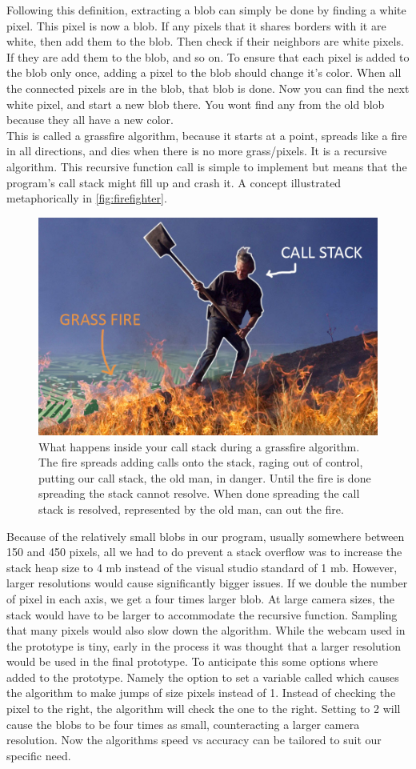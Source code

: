 Following this definition, extracting a blob can simply be done by finding a white pixel. This pixel is now a blob. If any pixels that it shares borders with it are white, then add them to the blob. Then check if their neighbors are white pixels. If they are add them to the blob, and so on. To ensure that each pixel is added to the blob only once, adding a pixel to the blob should change it's color. When all the connected pixels are in the blob, that blob is done. Now you can find the next white pixel, and start a new blob there. You wont find any from the old blob because they all have a new color.\\
This is called a grassfire algorithm, because it starts at a point, spreads like a fire in all directions, and dies when there is no more grass/pixels.
It is a recursive algorithm. This recursive function call is simple to implement but means that the program's call stack might fill up and crash it. A concept illustrated metaphorically in \autoref{fig:firefighter}.  
\begin{figure}[H]
	\centering
	\includegraphics[width=0.6\linewidth]{figure/Analysis/firefighter.jpg}
	\caption{What happens inside your call stack during a grassfire algorithm. The fire spreads adding calls onto the stack, raging out of control, putting our call stack, the old man, in danger. Until the fire is done spreading the stack cannot resolve. When done spreading the call stack is resolved, represented by the old man, can out the fire.}
	\label{fig:firefighter}
\end{figure} 
Because of the relatively small blobs in our program, usually somewhere between 150 and 450 pixels, all we had to do prevent a stack overflow was to increase the stack heap size to 4 mb instead of the visual studio standard of 1 mb. However, larger resolutions would cause significantly bigger issues. If we double the number of pixel in each axis, we get a four times larger blob. At large camera sizes, the stack would have to be larger to accommodate the recursive function. Sampling that many pixels would also slow down the algorithm. While the webcam used in the prototype is tiny, early in the process it was thought that a larger resolution would be used in the final prototype. To anticipate this some options where added to the prototype. Namely the option to set a variable called  which causes the algorithm to make jumps of size  pixels instead of 1. Instead of checking the pixel to the right, the algorithm will check the one  to the right. Setting  to 2 will cause the blobs to be four times as small, counteracting a larger camera resolution. Now the algorithms speed vs accuracy can be tailored to suit our specific need.
